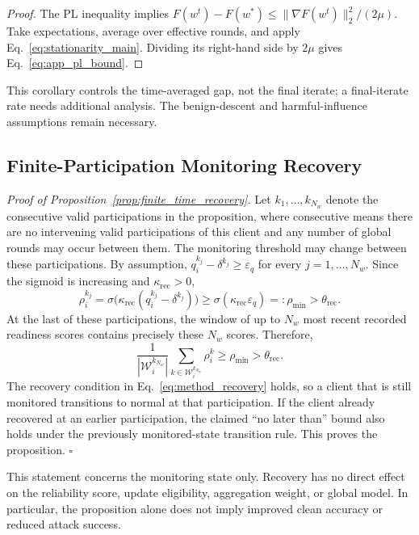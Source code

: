 \begin{proof}
The PL inequality implies $F(w^t)-F(w^\ast)\leq\|\nabla F(w^t)\|_2^2/(2\mu)$. Take expectations, average over effective rounds, and apply Eq.~\eqref{eq:stationarity_main}. Dividing its right-hand side by $2\mu$ gives Eq.~\eqref{eq:app_pl_bound}.
\end{proof}

\noindent This corollary controls the time-averaged gap, not the final iterate; a final-iterate rate needs additional analysis. The benign-descent and harmful-influence assumptions remain necessary.

\subsection{Finite-Participation Monitoring Recovery}
\label{app:proof_recovery}

\noindent\textit{Proof of Proposition~\ref{prop:finite_time_recovery}.} Let $k_1,\ldots,k_{N_w}$ denote the consecutive valid participations in the proposition, where consecutive means there are no intervening valid participations of this client and any number of global rounds may occur between them. The monitoring threshold may change between these participations. By assumption, $q_i^{k_j}-\delta^{k_j}\geq\varepsilon_q$ for every $j=1,\ldots,N_w$. Since the sigmoid is increasing and $\kappa_{\mathrm{rec}}>0$,
\begin{equation}
\rho_i^{k_j}=\sigma\big(\kappa_{\mathrm{rec}}(q_i^{k_j}-\delta^{k_j})\big)\geq\sigma(\kappa_{\mathrm{rec}}\varepsilon_q)=:\rho_{\min}>\theta_{\mathrm{rec}}.
\label{eq:app_recovery_score_bound}
\end{equation}
At the last of these participations, the window of up to $N_w$ most recent recorded readiness scores contains precisely these $N_w$ scores. Therefore,
\begin{equation}
\frac1{|\mathcal W_i^{k_{N_w}}|}\sum_{k\in\mathcal W_i^{k_{N_w}}}\rho_i^k\geq\rho_{\min}>\theta_{\mathrm{rec}}.
\end{equation}
The recovery condition in Eq.~\eqref{eq:method_recovery} holds, so a client that is still monitored transitions to normal at that participation. If the client already recovered at an earlier participation, the claimed ``no later than'' bound also holds under the previously monitored-state transition rule. This proves the proposition. \hfill$\square$

\noindent This statement concerns the monitoring state only. Recovery has no direct effect on the reliability score, update eligibility, aggregation weight, or global model. In particular, the proposition alone does not imply improved clean accuracy or reduced attack success.
